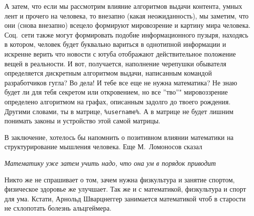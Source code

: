 А затем, что если мы рассмотрим влияние алгоритмов выдачи контента, умных лент и прочего на человека, то внезапно (какая неожиданность),
мы заметим, что они (снова внезапно) всецело формируют мировозрение и картину мира человека.
Соц.\ сети также могут формировать подобие информационного пузыря, находясь в котором,
человек будет буквально вариться в однотипной информации и искренне верить что новости с ютуба
отображают действительное положение вещей в реальности.
И вот, получается, наполнение черепушки обывателя определяется дискретным алгоритмом выдачи, написанным командой разработчиков гугла?
Во дела!
И тебе все еще не нужна математика?
Не знаю будет ли для тебя секретом или откровением, но все ''тво''" мировоззрение определено алгоритмом на графах,
описанным задолго до твоего рождения.
Другими словами, ты в матрице, \texttt{\%username\%}.
А в матрице не будет лишним понимать законы и устройство этой самой матрицы.

В заключение, хотелось бы напомнить о позитивном влиянии математики на структурирование мышления человека.
Еще М.\ Ломоносов сказал

\begin{displayquote}
    \textit{
        Математику уже затем учить надо, что она ум в порядок приводит
    }
\end{displayquote}

Никто же не спрашивает о том, зачем нужна физкультура и занятие спортом, физическое здоровье же улучшает.
Так же и с математикой, физкультура и спорт для ума.
Кстати, Арнольд Шварцнеггер занимается математикой чтоб в старости не схлопотать болезнь альцгеймера.